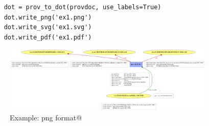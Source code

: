 \begin{verbatim}
    dot = prov_to_dot(provdoc, use_labels=True)
    dot.write_png('ex1.png')
    dot.write_svg('ex1.svg')
    dot.write_pdf('ex1.pdf')
\end{verbatim}

\begin{figure}
\centering
\includegraphics[width=0.9\textwidth]{access_ex1.png}
\caption{Example: png format@}
\label{fig:example}
\end{figure}


